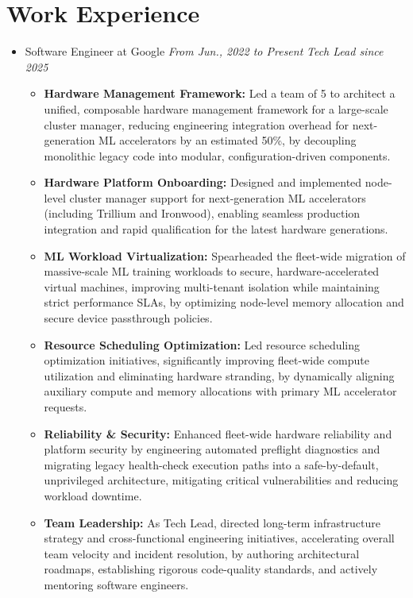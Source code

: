 \documentclass[letterpaper,11pt]{article}
\begin{document}
\maketitle

\section{Work Experience}
\begin{itemize}
    \item Software Engineer at Google
        \hfill \textit{From Jun., 2022 to Present}
    \newline \hfill \textit{Tech Lead since 2025}
    \begin{itemize}
        \item \textbf{Hardware Management Framework:} Led a team of 5 to architect a unified, composable hardware management framework for a large-scale cluster manager, reducing engineering integration overhead for next-generation ML accelerators by an estimated 50\%, by decoupling monolithic legacy code into modular, configuration-driven components.
        \item \textbf{Hardware Platform Onboarding:} Designed and implemented node-level cluster manager support for next-generation ML accelerators (including Trillium and Ironwood), enabling seamless production integration and rapid qualification for the latest hardware generations.
        \item \textbf{ML Workload Virtualization:} Spearheaded the fleet-wide migration of massive-scale ML training workloads to secure, hardware-accelerated virtual machines, improving multi-tenant isolation while maintaining strict performance SLAs, by optimizing node-level memory allocation and secure device passthrough policies.
        \item \textbf{Resource Scheduling Optimization:} Led resource scheduling optimization initiatives, significantly improving fleet-wide compute utilization and eliminating hardware stranding, by dynamically aligning auxiliary compute and memory allocations with primary ML accelerator requests.
        \item \textbf{Reliability \& Security:} Enhanced fleet-wide hardware reliability and platform security by engineering automated preflight diagnostics and migrating legacy health-check execution paths into a safe-by-default, unprivileged architecture, mitigating critical vulnerabilities and reducing workload downtime.
        \item \textbf{Team Leadership:} As Tech Lead, directed long-term infrastructure strategy and cross-functional engineering initiatives, accelerating overall team velocity and incident resolution, by authoring architectural roadmaps, establishing rigorous code-quality standards, and actively mentoring software engineers.
    \end{itemize}
\end{itemize}
\end{document}
